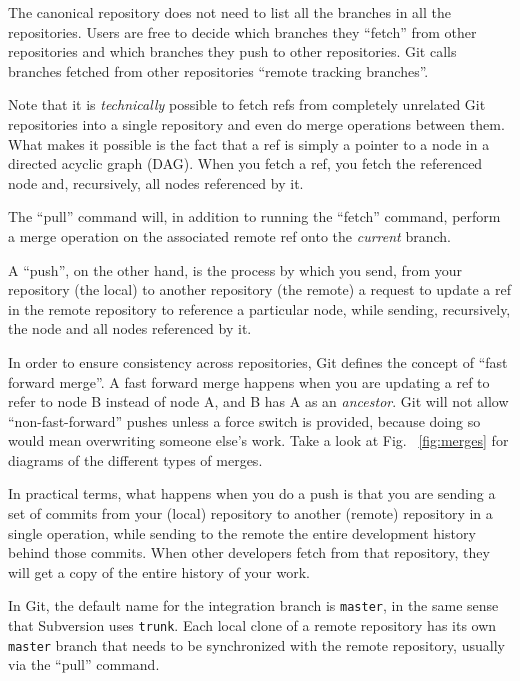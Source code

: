 The canonical repository does not need to list
all the branches in all the repositories. Users are free to decide
which branches they ``fetch'' from other repositories and which branches
they push to other repositories. Git calls branches fetched from other
repositories ``remote tracking branches''.

Note that it is \emph{technically} possible to fetch refs from completely
unrelated Git repositories into a single repository and even do merge
operations between them. What makes it possible is the fact that a ref is
simply a pointer to a node in a directed acyclic graph (DAG). When you fetch a
ref, you fetch the referenced node and, recursively, all nodes referenced by
it.

The ``pull'' command will, in addition to running the ``fetch''
command, perform a merge operation on the associated remote ref onto
the \emph{current} branch.

A ``push'', on the other hand, is the process by which you send, from
your repository (the local) to another repository (the remote)
a request to update a ref in the remote repository
to reference a particular node, while sending, recursively, the node and all
nodes referenced by it.

In order to ensure consistency across repositories, Git defines the concept of
``fast forward merge''. A fast forward merge happens when you are updating a
ref to refer to node B instead of node A, and B has A as an
\emph{ancestor}. Git will not allow ``non-fast-forward'' pushes unless a force
switch is provided, because doing so would mean overwriting someone else's
work. Take a look at Fig. ~\ref{fig:merges} for diagrams of the different
types of merges.

In practical terms, what happens when you do a push is that you are sending a
set of commits from your (local) repository to another (remote) repository in a
single operation, while sending to the remote the entire development history
behind those commits. When other developers fetch from that repository, they
will get a copy of the entire history of your work.

In Git, the default name for the integration branch is \texttt{master}, in the
same sense that Subversion uses \texttt{trunk}. Each local clone of a remote
repository has its own \texttt{master} branch that needs to be synchronized
with the remote repository, usually via the ``pull'' command.

